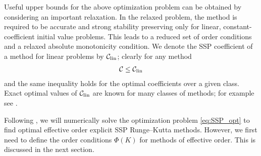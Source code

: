 Useful upper bounds for the above optimization problem can be obtained 
by considering an important relaxation. 
In the relaxed problem, the method is required to be accurate and strong 
stability preserving only for linear, constant-coefficient initial value problems. 
This leads to a reduced set of order conditions and a relaxed absolute 
monotonicity condition.
We denote the SSP coefficient of a method for linear problems by $\mathcal{C}_{\text{lin}}$; 
clearly for any method
\begin{align*}
	\mathcal{C}\le\mathcal{C}_{\text{lin}}
\end{align*}
and the same inequality holds for the optimal coefficients over a given class.
Exact optimal values of $\mathcal{C}_{\text{lin}}$ are known for many classes of methods; for
example see \cite{Kraaijevanger1986,ketcheson2009a}.

Following \cite{Ketcheson2008, Ketcheson/Macdonald/Gottlieb:2009}, 
we will numerically solve the optimization problem \eqref{eq:SSP_opt} to find
optimal effective order explicit SSP Runge--Kutta methods.
However, we first need to define the order conditions $\Phi(K)$ for methods
of effective order.
This is discussed in the next section.
